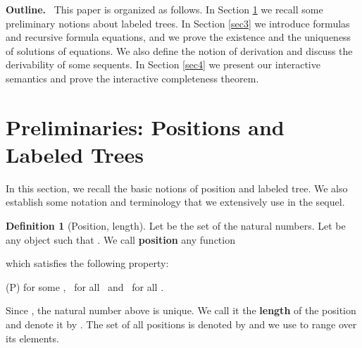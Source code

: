 \documentclass[copyright,creativecommons]{eptcs}
\theoremstyle{definition}
\newtheorem{Definition}[theorem]{Definition}
\newcommand{\squishlist}{
 \begin{list}{}
  { \setlength{\itemsep}{0pt}
     \setlength{\parsep}{3pt}
     \setlength{\topsep}{3pt}
     \setlength{\partopsep}{0pt}
     \setlength{\leftmargin}{1em}
     \setlength{\labelwidth}{1.5em}
     \setlength{\labelsep}{0.5em} } }
\newcommand{\squishend}{
  \end{list}  }
\begin{document}
\vspace{-0.35cm}



 \noindent \textbf{Outline.} \  This paper is organized as follows.
In Section \ref{sec2} we recall some preliminary
notions about labeled trees.
In Section \ref{sec3} we introduce
formulas and
 recursive formula equations, 	and
we prove the existence and the uniqueness of solutions of equations.
We also define the  notion of derivation and discuss
the derivability of some sequents.
In Section \ref{sec4} we present our interactive semantics
and prove the   interactive  completeness theorem.




\section{Preliminaries: Positions and Labeled Trees} \label{sec2}

In this section, we recall  the basic  notions of
position
and labeled tree.
We also establish some  notation and terminology that
we  extensively  use in the sequel.



\begin{Definition}[Position, length]
Let  be the set of the natural numbers.
Let  be any object such that
. We call \textbf{position}
any function

which satisfies the following property:
\squishlist
\item[ (P)] \quad for some    , \
   for  all  
\ and \   for  all .
\squishend
Since ,  the natural number   above
is unique. We call it the \textbf{length} of the position and  denote it by .
The set of all  positions
is denoted by   and we
use  to range over its elements.
\hfill 
\end{Definition}
\end{document}
